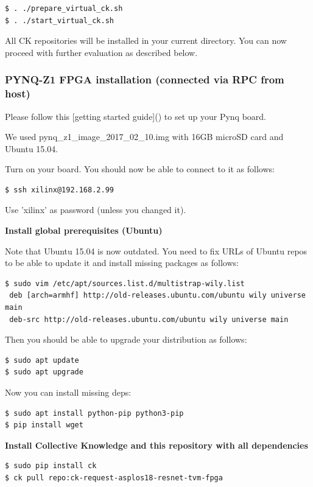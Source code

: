 \documentclass[sigconf]{acmart}
\begin{document}
\begin{verbatim}
$ . ./prepare_virtual_ck.sh
$ . ./start_virtual_ck.sh
\end{verbatim}

All CK repositories will be installed in your current directory.
You can now proceed with further evaluation as described below.

\subsubsection{PYNQ-Z1 FPGA installation (connected via RPC from host)}

Please follow this [getting started guide]() to set up your Pynq board.

We used pynq\_z1\_image\_2017\_02\_10.img with 16GB microSD card and Ubuntu 15.04.

Turn on your board. You should now be able to connect to it as follows:

\begin{verbatim}
$ ssh xilinx@192.168.2.99
\end{verbatim}

Use 'xilinx' as password (unless you changed it).

\textbf{Install global prerequisites (Ubuntu)}

Note that Ubuntu 15.04 is now outdated. You need to fix URLs of Ubuntu repos to be able to update it and install missing packages as follows:

\begin{verbatim}
$ sudo vim /etc/apt/sources.list.d/multistrap-wily.list
 deb [arch=armhf] http://old-releases.ubuntu.com/ubuntu wily universe main
 deb-src http://old-releases.ubuntu.com/ubuntu wily universe main
\end{verbatim}

Then you should be able to upgrade your distribution as follows:

\begin{verbatim}
$ sudo apt update
$ sudo apt upgrade
\end{verbatim}

Now you can install missing deps:

\begin{verbatim}
$ sudo apt install python-pip python3-pip
$ pip install wget
\end{verbatim}

\textbf{Install Collective Knowledge and this repository with all dependencies}

\begin{verbatim}
$ sudo pip install ck
$ ck pull repo:ck-request-asplos18-resnet-tvm-fpga
\end{verbatim}
\end{document}
